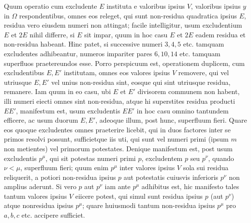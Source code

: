 Quum operatio cum excludente \(E\) instituta e valoribus ipsius \(V\), valoribus ipsius \(y\) in \(\Omega\) respondentibus, omnes eos releget, qui sunt non-residua quadratica ipsius \(E\), residua vero eiusdem numeri non attingat; facile intelligitur, usum excludentium \(E\) et \(2E\) nihil differre, si \(E\) sit impar, quum in hoc casu \(E\) et \(2E\) eadem residua et non-residua habeant. Hinc patet, si successive numeri \(3,\allowbreak 4,\allowbreak 5\) etc. tamquam excludentes adhibeantur, numeros impariter pares \(6,\allowbreak 10,\allowbreak 14\) etc. tamquam superfluos praetereundos esse. Porro perspicuum est, operationem duplicem, cum excludentibus \(E,\allowbreak E'\) institutam, omnes eos valores ipsius \(V\) removere, qui vel utriusque \(E,\allowbreak E'\) vel unius non-residua sint, eosque qui sint utriusque residua, remanere. Iam quum in eo casu, ubi \(E\) et \(E'\) divisorem communem non habent, illi numeri eiecti omnes sint non-residua, atque hi superstites residua producti \(EE'\), manifestum est, usum excludentis \(EE'\) in hoc casu omnino tantundem efficere, ac usum duorum \(E,\allowbreak E'\), adeoque illum, post hunc, superfluum fieri. Quare eos quoque excludentes omnes praeterire licebit, qui in duos factores inter se primos resolvi possunt, sufficietque iis uti, qui sunt vel numeri primi (ipsum \(m\) non metientes) vel primorum potestates. Denique manifestum est, post usum excludentis \(p^\mu\), qui sit potestas numeri primi \(p\), excludentem \(p\) seu \(p^\nu\), quando \(\nu<\mu\), superfluum fieri; quum enim \(p^\mu\) inter valores ipsius \(V\) sola sui residua reliquerit, a potiori non-residua ipsius \(p\) aut potestatis cuiusvis inferioris \(p^\nu\) non amplius aderunt. Si vero \(p\) aut \(p^\nu\) iam ante \(p^\mu\) adhibitus est, hic manifesto tales tantum valores ipsius \(V\) eiicere potest, qui simul sunt residua ipsius \(p\) (aut \(p^\nu\)) atque nonresidua ipsius \(p^\mu\); quare huiusmodi tantum non-residua ipsius \(p^\mu\) pro \(a,\allowbreak b,\allowbreak c\) etc. accipere sufficiet.

